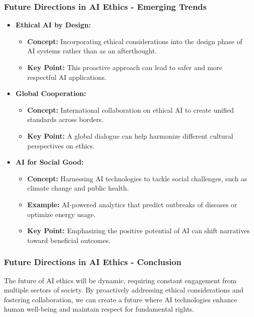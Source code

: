 \documentclass[aspectratio=169]{beamer}
\begin{document}
\begin{frame}[fragile]
    \frametitle{Future Directions in AI Ethics - Emerging Trends}
    \begin{itemize}
        \item \textbf{Ethical AI by Design:}
            \begin{itemize}
                \item \textbf{Concept:} Incorporating ethical considerations into the design phase of AI systems rather than as an afterthought.
                \item \textbf{Key Point:} This proactive approach can lead to safer and more respectful AI applications.
            \end{itemize}

        \item \textbf{Global Cooperation:}
            \begin{itemize}
                \item \textbf{Concept:} International collaboration on ethical AI to create unified standards across borders.
                \item \textbf{Key Point:} A global dialogue can help harmonize different cultural perspectives on ethics.
            \end{itemize}
        
        \item \textbf{AI for Social Good:}
            \begin{itemize}
                \item \textbf{Concept:} Harnessing AI technologies to tackle social challenges, such as climate change and public health.
                \item \textbf{Example:} AI-powered analytics that predict outbreaks of diseases or optimize energy usage.
                \item \textbf{Key Point:} Emphasizing the positive potential of AI can shift narratives toward beneficial outcomes.
            \end{itemize}
    \end{itemize}
\end{frame}

\begin{frame}[fragile]
    \frametitle{Future Directions in AI Ethics - Conclusion}
    The future of AI ethics will be dynamic, requiring constant engagement from multiple sectors of society. By proactively addressing ethical considerations and fostering collaboration, we can create a future where AI technologies enhance human well-being and maintain respect for fundamental rights.
\end{frame}
\end{document}
